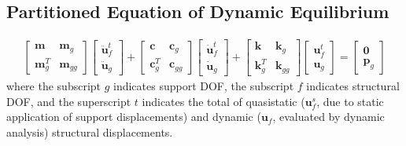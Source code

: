 \documentclass[letterpaper,10pt,english]{sphinxmanual}
\begin{document}
\subsection{Partitioned Equation of Dynamic Equilibrium}
\label{\detokenize{theory/statespace:partitioned-equation-of-dynamic-equilibrium}}\begin{equation*}
\begin{split}\begin{bmatrix} \mathbf{m} & \mathbf{m}_{g} \\ \mathbf{m}^T_{g} & \mathbf{m}_{gg} \end{bmatrix}
\begin{bmatrix} \mathbf{\ddot{u}}^{t}_{f} \\ \mathbf{\ddot{u}}_{g} \end{bmatrix}
+
\begin{bmatrix} \mathbf{c} & \mathbf{c}_{g} \\ \mathbf{c}^T_{g} & \mathbf{c}_{gg} \end{bmatrix}
\begin{bmatrix} \mathbf{\dot{u}}^{t}_{f} \\ \mathbf{\dot{u}}_{g} \end{bmatrix}
+
\begin{bmatrix} \mathbf{k} & \mathbf{k}_{g} \\ \mathbf{k}^T_{g} & \mathbf{k}_{gg} \end{bmatrix}
\begin{bmatrix} \mathbf{u}^{t}_{f} \\ \mathbf{u}_{g} \end{bmatrix}
=
\begin{bmatrix} \mathbf{0} \\ \mathbf{p}_{g} \end{bmatrix}\end{split}
\end{equation*}
\sphinxAtStartPar
where the subscript \(g\) indicates support DOF, the subscript
\(f\) indicates structural DOF, and the superscript \(t\)
indicates the total of quasi\sphinxhyphen{}static (\(\mathbf{u}^{s}_{f}\), due to
static application of support displacements) and dynamic
(\(\mathbf{u}_{f}\), evaluated by dynamic analysis) structural
displacements.
\end{document}
